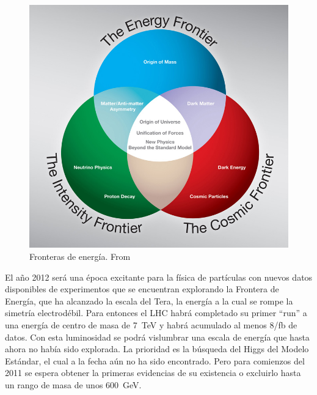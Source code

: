 \begin{figure}
  \centering
\includegraphics[scale=0.3]{three-frontiers-large}
  \caption{Fronteras de energía. From \cite{fermilab}}
  \label{fig:1}
\end{figure}

El año 2012 será una época excitante para la física de partículas con
nuevos datos disponibles de experimentos que se encuentran explorando
la Frontera de Energía, que ha alcanzado la escala del Tera, la
energía a la cual se rompe la simetría electrodébil. Para entonces el
LHC habrá completado su primer ``run'' a una energía de centro de masa
de 7~TeV y habrá acumulado al menos 8/fb de datos. Con esta
luminosidad se podrá vislumbrar una escala de energía que hasta ahora
no había sido explorada. La prioridad es la búsqueda del Higgs del
Modelo Estándar, el cual a la fecha aún no ha sido encontrado. Pero
para comienzos del 2011 se espera obtener la primeras evidencias de su
existencia o excluirlo hasta un rango de masa de unos 600~GeV.

